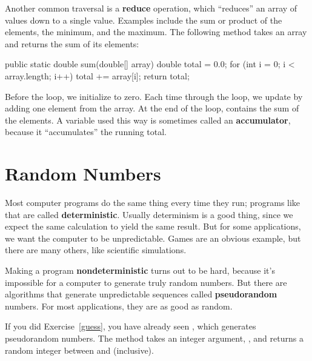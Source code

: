 
Another common traversal is a {\bf reduce} operation, which ``reduces'' an array of values down to a single value.
Examples include the sum or product of the elements, the minimum, and the maximum.
The following method takes an array and returns the sum of its elements:

\begin{code}
public static double sum(double[] array) {
    double total = 0.0;
    for (int i = 0; i < array.length; i++) {
        total += array[i];
    }
    return total;
}
\end{code}


Before the loop, we initialize  to zero.
Each time through the loop, we update  by adding one element from the array.
At the end of the loop,  contains the sum of the elements.
A variable used this way is sometimes called an {\bf accumulator}, because it ``accumulates'' the running total.


\section{Random Numbers}
\label{random}


Most computer programs do the same thing every time they run; programs like that are called {\bf deterministic}.
Usually determinism is a good thing, since we expect the same calculation to yield the same result.
But for some applications, we want the computer to be unpredictable.
Games are an obvious example, but there are many others, like scientific simulations.



Making a program {\bf nondeterministic} turns out to be hard, because it's impossible for a computer to generate truly random numbers.
But there are algorithms that generate unpredictable sequences called {\bf pseudorandom} numbers.
For most applications, they are as good as random.



If you did Exercise~\ref{guess}, you have already seen , which generates pseudorandom numbers.
The method  takes an integer argument, , and returns a random integer between  and  (inclusive).

